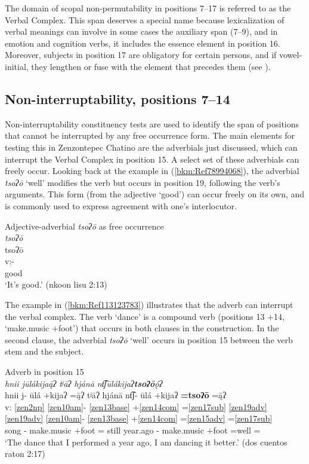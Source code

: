 \documentclass[output=paper]{langscibook}
\begin{document}
The domain of scopal non-permutability in positions 7{}--17 is referred to as the Verbal Complex. This span deserves a special name because lexicalization of verbal meanings can involve in some cases the auxiliary span (7{}--9), and in emotion and cognition verbs, it includes the essence element in position 16. Moreover, subjects in position 17 are obligatory for certain persons, and if vowel-initial, they lengthen or fuse with the element that precedes them (see ).

\subsection{Non-interruptability, positions 7{}--14}
\label{bkm:Ref113137532}\label{bkm:Ref113307818}
Non-interruptability constituency tests are used to identify the span of positions that cannot be interrupted by any free occurrence form. The main elements for testing this in Zenzontepec Chatino are the adverbials just discussed, which can interrupt the Verbal Complex in position 15. A select set of these adverbials can freely occur. Looking back at the example in (\ref{bkm:Ref78994068}), the adverbial \textit{tsoʔō} `well' modifies the verb but occurs in position 19, following the verb's arguments. This form (from the adjective `good') can occur freely on its own, and is commonly used to express agreement with one's interlocutor.


\ea\label{chatino:ex:key:8}{Adjective-adverbial \textit{tsoʔō} as free occurrence}\\
\textit{tsoʔō} \\ 
\glll tsoʔō\\
v:- \\
     good\\
\glt `It's good.' (nkoon lisu 2:13)
\z

The example in (\ref{bkm:Ref113123783}) illustrates that the adverb can interrupt the verbal complex. The verb `dance' is a compound verb (positions 13 +14, `make.music +foot') that occurs in both clauses in the construction. In the second clause, the adverbial \textit{tsoʔō} `well' occurs in position 15 between the verb stem and the subject.


\ea\label{bkm:Ref113123783}Adverb in position 15 \\
\textit{hnii jūlákija\={ą}ʔ tʲāʔ hjánā nt͡ʃūlákijaʔ}\textbf{\textit{tsoʔō}}\textit{\'{ǫ}ʔ} \\ 
\glll {} hnii j- ūlá +kijaʔ =\={ą}ʔ tʲāʔ hjánā nt͡ʃ- ūlá +kijaʔ \textbf{=tsoʔō} =ą̄ʔ\\
v: \ref{zen2np} \ref{zen10am}{}- \ref{zen13base} +\ref{zen14com} =\ref{zen17sub} \ref{zen19adv} \ref{zen19adv} \ref{zen10am}{}- \ref{zen13base} +\ref{zen14com} =\ref{zen15adv} =\ref{zen17sub} \\
{} song \Pfv{}- make.music +foot =\First\Sg{} still year.ago \Prog{}- make.music +foot =well =\First\Sg{}\\
\glt `The dance that I performed a year ago, I am dancing it better.' (dos cuentos raton 2:17)
\z
\end{document}
